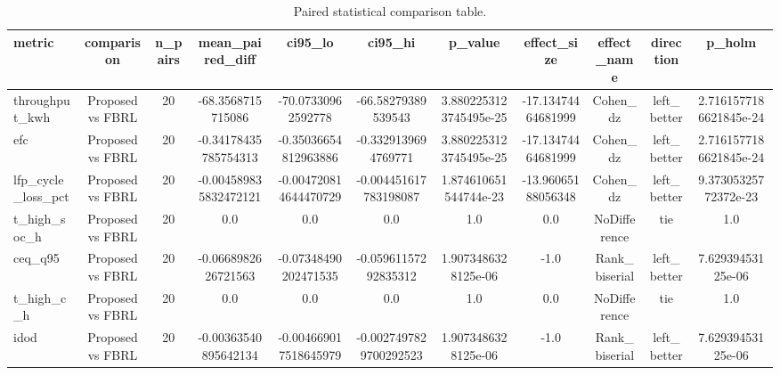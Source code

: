 \begin{table}[t]
\centering
\caption{Paired statistical comparison table.}
\label{tab:stats_auto}
\begin{tabular}{lcccccccccc}
\toprule
metric & comparison & n\_pairs & mean\_paired\_diff & ci95\_lo & ci95\_hi & p\_value & effect\_size & effect\_name & direction & p\_holm \\
\midrule
throughput\_kwh & Proposed vs FBRL & 20 & -68.3568715715086 & -70.07330962592778 & -66.58279389539543 & 3.8802253123745495e-25 & -17.13474464681999 & Cohen\_dz & left\_better & 2.7161577186621845e-24 \\
efc & Proposed vs FBRL & 20 & -0.34178435785754313 & -0.35036654812963886 & -0.3329139694769771 & 3.8802253123745495e-25 & -17.13474464681999 & Cohen\_dz & left\_better & 2.7161577186621845e-24 \\
lfp\_cycle\_loss\_pct & Proposed vs FBRL & 20 & -0.004589835832472121 & -0.004720814644470729 & -0.004451617783198087 & 1.874610651544744e-23 & -13.96065188056348 & Cohen\_dz & left\_better & 9.37305325772372e-23 \\
t\_high\_soc\_h & Proposed vs FBRL & 20 & 0.0 & 0.0 & 0.0 & 1.0 & 0.0 & NoDifference & tie & 1.0 \\
ceq\_q95 & Proposed vs FBRL & 20 & -0.0668982626721563 & -0.07348490202471535 & -0.05961157292835312 & 1.9073486328125e-06 & -1.0 & Rank\_biserial & left\_better & 7.62939453125e-06 \\
t\_high\_c\_h & Proposed vs FBRL & 20 & 0.0 & 0.0 & 0.0 & 1.0 & 0.0 & NoDifference & tie & 1.0 \\
idod & Proposed vs FBRL & 20 & -0.00363540895642134 & -0.004669017518645979 & -0.0027497829700292523 & 1.9073486328125e-06 & -1.0 & Rank\_biserial & left\_better & 7.62939453125e-06 \\
\bottomrule
\end{tabular}
\end{table}